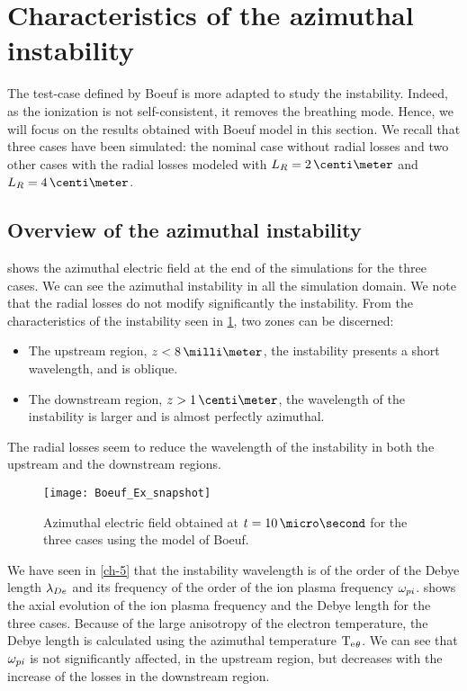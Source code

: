 
\section{Characteristics of the azimuthal instability}

The test-case defined by Boeuf is more adapted to  study the instability.
Indeed, as the ionization is not self-consistent, it removes the breathing mode.
Hence, we will focus on the results obtained with Boeuf model in this section.
We recall that three cases have been simulated\string: the nominal case without radial losses and two other cases with the radial losses modeled with $L_R=2\,\centi\meter$ and $L_R=4\,\centi\meter$.

\subsection{Overview of the azimuthal instability} \label{subsec-azi_insta_Ztheta}
 shows the azimuthal electric field at the end of the simulations for the three cases.
We can see the azimuthal instability in all the simulation domain.
We note that the radial losses do not modify significantly the instability.
From the characteristics of the instability seen in \cref{fig-snapshots}, two zones can be discerned\string:
\begin{itemize}
  \item The upstream region, $z < 8 \,\milli\meter$, the instability presents a short wavelength, and is oblique.
  \item The downstream region, $z > 1\,\centi\meter$, the wavelength of the instability is larger and is almost perfectly azimuthal.
\end{itemize}
The radial losses seem to reduce the wavelength of the instability in both the upstream and the downstream regions.


\begin{figure}[hbt]
  \centering
  \texttt{[image: Boeuf\_Ex\_snapshot]}
  \caption{Azimuthal electric field obtained at $t=10 \,\micro\second$ for the three cases using the model of Boeuf.}
  \label{fig-snapshots}
\end{figure}

We have seen in \cref{ch-5} that the instability wavelength is of the order of the Debye length $\lambda_{De}$ and its frequency of the order of the ion plasma frequency $\omega_{pi}$.
 shows the axial evolution of the ion plasma frequency and the Debye length for the three cases.
Because of the large anisotropy of the electron temperature, the Debye length is calculated using the azimuthal temperature $\mathrm{T_e}_{\theta}$.
We can see that $\omega_{pi}$ is not significantly affected, in the upstream region, but decreases with the increase of the losses in the downstream region.


